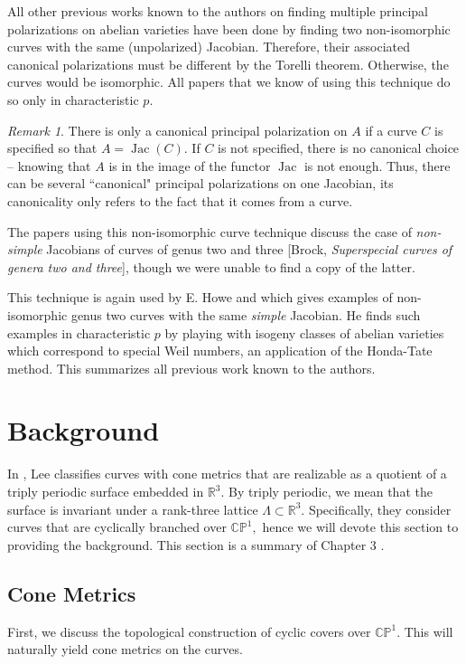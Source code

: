 \documentclass[12pt,reqno]{amsart}
\DeclareMathOperator{\Jac}{Jac}
\newcommand{\R}{\mathbb{R}}
\theoremstyle{definition}
\theoremstyle{remark}
\newtheorem*{remark}{Remark}
\begin{document}
All other previous works known to the authors on finding multiple principal polarizations on abelian varieties have been done by finding two non-isomorphic curves with the same (unpolarized) Jacobian. Therefore, their associated canonical polarizations must be different by the Torelli theorem. Otherwise, the curves would be isomorphic. All papers that we know of using this technique do so only in characteristic $p$. 

\begin{remark} There is only a canonical principal polarization on $A$ if a curve $C$ is specified so that $A = \Jac(C).$ If $C$ is not specified, there is no canonical choice -- knowing that $A$ is in the image of the functor $\Jac$ is not enough. Thus, there can be several ``canonical" principal polarizations on one Jacobian, its canonicality only refers to the fact that it comes from a curve. \end{remark}

The papers using this non-isomorphic curve technique discuss the case of \textit{non-simple} Jacobians of curves of genus two \cite{iko} and three [Brock, \textit{Superspecial curves of genera two and three}], though we were unable to find a copy of the latter. 

This technique is again used by E. Howe \cite{howe1} and \cite{howe2} which gives examples of non-isomorphic genus two curves with the same \textit{simple} Jacobian. He finds such examples in characteristic $p$ by playing with isogeny classes of abelian varieties which correspond to special Weil numbers, an application of the Honda-Tate method. This summarizes all previous work known to the authors.


\section{Background}
\label{sec: dthesis}
In \cite{dthesis}, Lee classifies curves with cone metrics that are realizable as a quotient of a triply periodic surface embedded in $\R^3.$ By triply periodic, we mean that the surface is invariant under a rank-three lattice $\Lambda \subset \R^3.$ Specifically, they consider curves that are cyclically branched over $\mathbb{C}\mathbb{P}^1,$ hence we will devote this section to providing the background. This section is a summary of Chapter 3 \cite{dthesis}. 

\subsection{Cone Metrics}
First, we discuss the topological construction of cyclic covers over $\mathbb{C}\mathbb{P}^1.$ This will naturally yield cone metrics on the curves.
\end{document}
